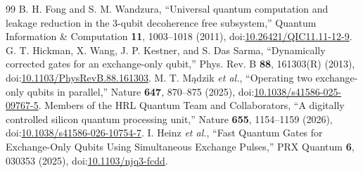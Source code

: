 \documentclass[aps,prx,twocolumn,superscriptaddress,10pt,longbibliography,floatfix]{revtex4-2}
\begin{document}
\begin{thebibliography}{99}
 B. H. Fong and S. M. Wandzura, ``Universal quantum computation and leakage reduction in the 3-qubit decoherence free subsystem,'' Quantum Information \& Computation \textbf{11}, 1003--1018 (2011), doi:\href{https://doi.org/10.26421/QIC11.11-12-9}{10.26421/QIC11.11-12-9}.
 G. T. Hickman, X. Wang, J. P. Kestner, and S. Das Sarma, ``Dynamically corrected gates for an exchange-only qubit,'' Phys. Rev. B \textbf{88}, 161303(R) (2013), doi:\href{https://doi.org/10.1103/PhysRevB.88.161303}{10.1103/PhysRevB.88.161303}.
 M. T. M\k{a}dzik \emph{et al.}, ``Operating two exchange-only qubits in parallel,'' Nature \textbf{647}, 870--875 (2025), doi:\href{https://doi.org/10.1038/s41586-025-09767-5}{10.1038/s41586-025-09767-5}.
 Members of the HRL Quantum Team and Collaborators, ``A digitally controlled silicon quantum processing unit,'' Nature \textbf{655}, 1154--1159 (2026), doi:\href{https://doi.org/10.1038/s41586-026-10754-7}{10.1038/s41586-026-10754-7}.
 I. Heinz \emph{et al.}, ``Fast Quantum Gates for Exchange-Only Qubits Using Simultaneous Exchange Pulses,'' PRX Quantum \textbf{6}, 030353 (2025), doi:\href{https://doi.org/10.1103/njq3-fcdd}{10.1103/njq3-fcdd}.
\end{thebibliography}
\end{document}
